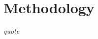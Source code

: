 \chapter{Methodology}
\label{sec: method}
\epigraph{\emph{quote}}{\citep[]{bilbow2022}}

% 
% 
% 
% 
% 
% 
% 
% 
% 
% 
% 
% 
% 
% 
% 
% 
% 
% 
% 
% 
% 
% 
% 
% 
% 